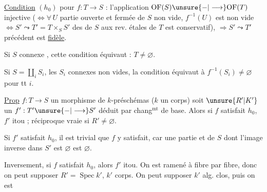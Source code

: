 \uline{Condition}  $(h_0)$ pour $f:T\longrightarrow S$ : l'application $\mathrm{OF}(S)\unsure{-|\longrightarrow}\mathrm{OF}(T)$ injective ($\Longleftrightarrow\forall\,U$ partie ouverte et fermée de $S$ non vide, $f^{-1}(U)$ est non vide $\Longleftrightarrow S'\leadsto T'=T\times_S S'$ des  de $S$ aux rev. étales de $T$ est  conservatif\deleted{\unsure{)}}), $\Longrightarrow S'\leadsto T'$ précédent est \uline{fidèle}.

Si $S$ connexe \inserted{$\ne\varnothing$}, cette condition équivaut : $T\ne\varnothing$.

Si $S=\coprod\limits_i S_i$, les $S_i$ connexes non vides, la condition équivaut à $f^{-1}(S_i)\ne\varnothing$ pour tt $i$.


\uline{Prop}   $f:T\longrightarrow S$  un morphisme de $k$-préschémas ($k$ un corps) soit $\unsure{R'|K'}$ un   $f':T'\unsure{-|\longrightarrow}S'$ déduit par chang$^{\mathrm{mt}}$ de base. Alors si $f$ satisfait $h_0$,  $f'$  itou ; réciproque vraie si $R'\ne\varnothing$.

Si $f'$ satisfait $h_0$,  il est trivial que $f$ y satisfait, car  une partie   et   de $S$ dont l'image inverse dans $S'$ est $\varnothing$ est $\varnothing$.

Inversement, si $f$ satisfait $h_0$, alors $f'$ itou. On est ramené à  fibre par fibre, donc on peut supposer $R'=\operatorname{Spec}k'$, $k'$ corps. On peut supposer $k'$ alg. clos, puis on est
